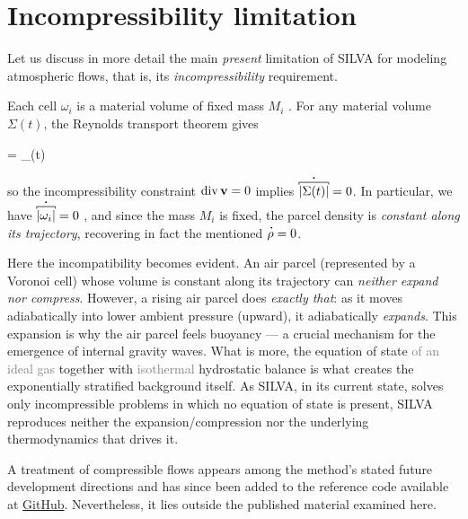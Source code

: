 \documentclass[../main.tex]{subfiles}
\begin{document}
\section{Incompressibility limitation}
\label{sec:LIMITATION}

Let us discuss in more detail the main \emph{present} limitation of SILVA for modeling atmospheric flows, that is, its \emph{incompressibility} requirement.

Each cell $\omega_i$ is a material volume of fixed mass $M_i$ \autocite[p.~91]{kinclSemiimplicitLagrangianVoronoi2025}. For any material volume $\Sigma(t)$, the Reynolds transport theorem gives

\begin{equations}[single,*]
 = \int_{\Sigma(t)} \div {}  \eqcomma
\end{equations}

so the incompressibility constraint $\operatorname{div} \mathbf{v} = 0$ implies $\btdot{\abs{\Sigma(t)}} = 0$. In particular, we have $\btdot{\abs{\omega_i}} = 0$ \autocite[p.~97]{kinclSemiimplicitLagrangianVoronoi2025}, and since the mass $M_i$ is fixed, the parcel density is \emph{constant along its trajectory}, recovering in fact the mentioned $\tdot{\rho} = 0$.

Here the incompatibility becomes evident. An air parcel (represented by a Voronoi cell) whose volume is constant along its trajectory can \emph{neither expand nor compress}. However, a rising air parcel does \emph{exactly that}: as it moves adiabatically into lower ambient pressure (upward), it adiabatically \emph{expands}. This expansion is why the air parcel feels buoyancy --- a crucial mechanism for the emergence of internal gravity waves. What is more, the equation of state \textcolor{gray}{of an ideal gas} together with \textcolor{gray}{isothermal} hydrostatic balance is what creates the exponentially stratified background itself. As SILVA, in its current state, solves only incompressible problems in which no equation of state is present, SILVA reproduces neither the expansion/compression nor the underlying thermodynamics that drives it.

A treatment of compressible flows appears among the method's stated future development directions \autocite[p.~109]{kinclSemiimplicitLagrangianVoronoi2025} and has since been added to the reference code \autocite{Kincl_LagrangianVoronoi_jl} available at \href{https://github.com/OndrejKincl/LagrangianVoronoi.jl}{GitHub}. Nevertheless, it lies outside the published material examined here.
\end{document}
